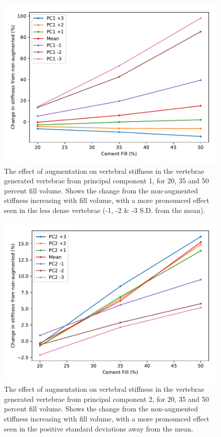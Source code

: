 \begin{figure}[h]
  \centering
  \includegraphics[width=.9\textwidth]{Chapters/Chapter_PCA_images/pca_percent_fill_pc1.pdf}
  \caption[Effect of augmentation in principal component 1.]{The effect of augmentation on vertebral stiffness in the vertebrae generated vertebrae from principal component 1, for 20, 35 and 50 percent fill volume. Shows the change from the non-augmented stiffness increasing with fill volume, with a more pronounced effect seen in the less dense vertebrae (-1, -2 \& -3 S.D. from the mean).}
  \label{fig:pca_percent_fill_pc1}
\end{figure}

\begin{figure}[h]
  \centering
  \includegraphics[width=.9\textwidth]{Chapters/Chapter_PCA_images/pca_percent_fill_pc2.pdf}
  \caption[Effect of augmentation in principal component 2.]{The effect of augmentation on vertebral stiffness in the vertebrae generated vertebrae from principal component 2, for 20, 35 and 50 percent fill volume. Shows the change from the non-augmented stiffness increasing with fill volume, with a more pronounced effect seen in the positive standard deviations away from the mean.}
  \label{fig:pca_percent_fill_pc2}
\end{figure}

